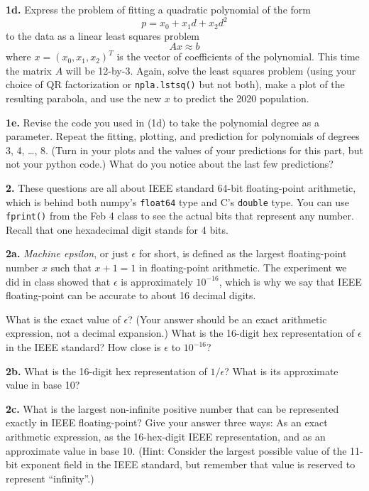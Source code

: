 \documentclass[11pt]{article}
\begin{document}
\par\medskip
{\bf 1d.}
Express the problem of fitting a quadratic polynomial of the form
$$ p = x_0 + x_1d + x_2d^2 $$
to the data as a linear least squares problem
$$A x \approx b$$
where $x = (x_0, x_1, x_2)^T$ is the vector of coefficients of the polynomial.
This time the matrix $A$ will be 12-by-3.
Again, solve the least squares problem 
(using your choice of QR factorization or {\tt npla.lstsq()} but not both),
make a plot of the resulting parabola, 
and use the new $x$ to predict the 2020 population.

\par\medskip
{\bf 1e.}
Revise the code you used in (1d) to take the polynomial degree as a parameter.
Repeat the fitting, plotting, and prediction 
for polynomials of degrees 3, 4, \ldots, 8.
(Turn in your plots and the values of your predictions for this part,
but not your python code.)
What do you notice about the last few predictions?

\par\bigskip
{\bf 2.}
These questions are all about IEEE standard 64-bit floating-point arithmetic,
which is behind both numpy's {\tt float64} type and C's {\tt double} type.
You can use {\tt fprint()} from the Feb 4 class to see
the actual bits that represent any number.
Recall that one hexadecimal digit stands for 4 bits.

\par\medskip
{\bf 2a.}
{\em Machine epsilon}, or just $\epsilon$ for short, is defined as the largest
floating-point number $x$ such that $x + 1 = 1$ in floating-point arithmetic.
The experiment we did in class showed that $\epsilon$ is approximately $10^{-16}$,
which is why we say that IEEE floating-point can be accurate to
about 16 decimal digits.

What is the exact value of $\epsilon$? (Your answer should be an exact arithmetic
expression, not a decimal expansion.) What is the 16-digit hex representation of
$\epsilon$ in the IEEE standard? How close is $\epsilon$ to $10^{-16}$?

\par\medskip
{\bf 2b.}
What is the 16-digit hex representation of $1/\epsilon$? What is its approximate
value in base 10?

\par\medskip
{\bf 2c.}
What is the largest non-infinite positive number that can be represented exactly
in IEEE floating-point? Give your answer three ways: As an exact arithmetic
expression, as the 16-hex-digit IEEE representation, and as an approximate
value in base 10. (Hint: Consider the largest possible value of the 11-bit
exponent field in the IEEE standard, but remember that value is reserved
to represent ``infinity''.)
\end{document}

